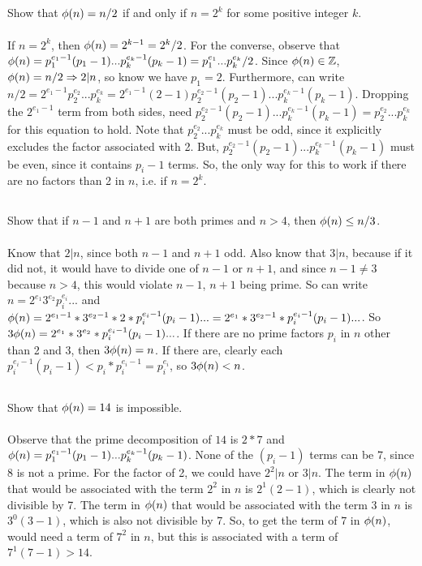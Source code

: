 \documentclass{article}
\begin{document}
\subsection{}
Show that $\phi(n) = n/2$ if and only if $n = 2^k$ for some positive integer $k$.\\~\\
If $n = 2^k$, then $\phi(n) = 2^{k - 1} = 2^k/2$.
For the converse, observe that
$\phi(n) = p_1^{e_1-1}(p_1-1)...p_k^{e_k-1}(p_k-1) = p_1^{e_1}...p_k^{e_k}/2$.
Since $\phi(n) \in \mathbb{Z}$, $\phi(n) = n/2 \Rightarrow 2|n$, so know we have $p_1 = 2$.
Furthermore, can write $n/2 = 2^{e_1-1}p_2^{e_2}...p_k^{e_k} =
2^{e_1-1}(2-1)p_2^{e_2-1}(p_2-1)...p_k^{e_k-1}(p_k-1)$.
Dropping the $2^{e_1-1}$ term from both sides,
need $p_2^{e_2-1}(p_2-1)...p_k^{e_k-1}(p_k-1) = p_2^{e_2}...p_k^{e_k}$
for this equation to hold.
Note that $p_2^{e_2}...p_k^{e_k}$ must be odd, since it explicitly excludes
the factor associated with 2.
But, $p_2^{e_2-1}(p_2-1)...p_k^{e_k-1}(p_k-1)$ must be even, since it contains
$p_i - 1$ terms.
So, the only way for this to work if there are no factors than 2 in $n$,
i.e. if $n = 2^k$.

\subsection{}
Show that if $n - 1$ and $n + 1$ are both primes and $n > 4$,
then $\phi(n) \leq n/3$.\\~\\
Know that $2|n$, since both $n - 1$ and $n + 1$ odd.
Also know that $3|n$, because if it did not, it would have to divide one of
$n - 1$ or $n + 1$, and since $n - 1 \neq 3$ because $n > 4$,
this would violate $n - 1$, $n + 1$ being prime.
So can write $n = 2^{e_1}3^{e_2}p_i^{e_i}...$
and $\phi(n) = 2^{e_1-1}*3^{e_2-1}*2*p_i^{e_i-1}(p_i-1)...
= 2^{e_1}*3^{e_2-1}*p_i^{e_i-1}(p_i-1)...$.
So $3\phi(n) = 2^{e_1}*3^{e_2}*p_i^{e_i-1}(p_i-1)...$.
If there are no prime factors $p_i$ in $n$ other than 2 and 3,
then $3\phi(n) = n$.
If there are, clearly each $p_i^{e_i-1}(p_i-1) < p_i*p_i^{e_i-1} = p_i^{e_i}$,
so $3\phi(n) < n$.

\subsection{}
Show that $\phi(n) = 14$ is impossible.\\~\\
Observe that the prime decomposition of $14$ is $2 * 7$
and $\phi(n) = p_1^{e_1-1}(p_1-1)...p_k^{e_k-1}(p_k-1)$.
None of the $(p_i - 1)$ terms can be 7, since 8 is not a prime.
For the factor of 2, we could have $2^2|n$ or $3|n$.
The term in $\phi(n)$ that would be associated with the term
$2^2$ in $n$ is $2^1(2 - 1)$, which is clearly not divisible by 7.
The term in $\phi(n)$ that would be associated with the term
$3$ in $n$ is $3^0(3 - 1)$, which is also not divisible by 7.
So, to get the term of 7 in $\phi(n)$,
would need a term of $7^2$ in $n$, but this is associated with a 
term of $7^1(7 - 1) > 14$.
\end{document}
